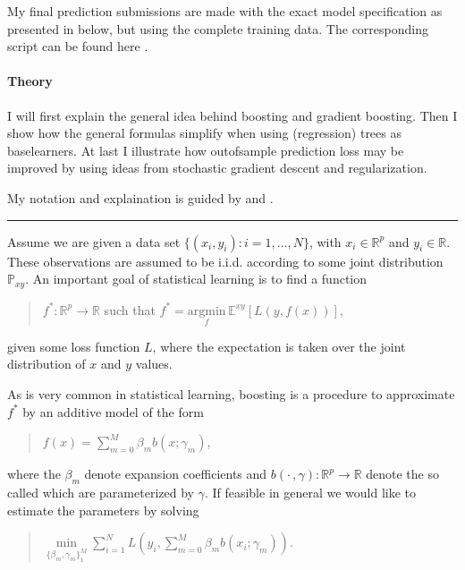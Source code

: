 \documentclass[letterpaper,10pt,english]{sphinxmanual}
\begin{document}
 My final prediction submissions are made with the exact model specification as presented in below, but using the complete training data. The corresponding script can be found here .


\paragraph{Theory}
\label{\detokenize{simulated_final:theory}}
I will first explain the general idea behind boosting and gradient boosting. Then I show how the general formulas simplify when using (regression) trees as base\sphinxhyphen{}learners. At last I illustrate how out\sphinxhyphen{}of\sphinxhyphen{}sample prediction loss may be improved by using ideas from stochastic gradient descent and regularization.

 My notation and explaination is guided by  and .


\bigskip\hrule\bigskip



Assume we are given a data set \(\{(x_i, y_i) : i=1,\dots,N\}\), with \(x_i \in \mathbb{R}^p\) and \(y_i \in \mathbb{R}\). These observations are assumed to be i.i.d. according to some joint distribution \(\mathbb{P}_{xy}\). An important goal of statistical learning is to find a function
\begin{quote}

\(f^* : \mathbb{R}^p \to \mathbb{R}\) such that \(f^* = \underset{f}{\text{argmin}} \, \mathbb{E}^{xy} \left [L(y, f(x)) \right]\),
\end{quote}

given some loss function \(L\), where the expectation is taken over the joint distribution of \(x\) and \(y\) values.

As is very common in statistical learning, boosting is a procedure to approximate \(f^*\) by an additive model of the form
\begin{quote}

\(f(x) = \sum_{m=0}^M \beta_m b(x; \gamma_m)\),
\end{quote}

where the \(\beta_m\) denote expansion coefficients and \(b(\cdot\,,\gamma) : \mathbb{R}^p \to \mathbb{R}\) denote the so called  which are parameterized by \(\gamma\). If feasible in general we would like to estimate the parameters by solving
\begin{quote}

\(\underset{\{\beta_m, \gamma_m\}_1^M}{\min}  \sum_{i=1}^N L\left(y_i, \sum_{m=0}^M \beta_m b(x_i; \gamma_m)\right)\).
\end{quote}
\end{document}
